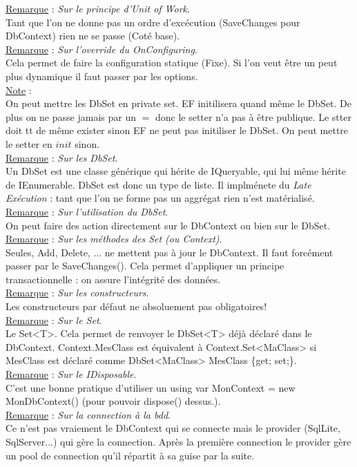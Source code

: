 \documentclass[a4paper,12pt,twoside]{article}
\newcommand{\rem}[2]{\noindent\underline{Remarque} : \textit{#1}.\\ \indent #2}
\newcommand{\note}[1]{\noindent\underline{Note} : \\ \indent #1}
\begin{document}
\rem{Sur le principe d'Unit of Work}{Tant que l'on ne donne pas un ordre d'excécution (SaveChanges pour DbContext) rien ne se passe (Coté base).}\\

\rem{Sur l'override du OnConfiguring}{Cela permet de faire la configuration statique (Fixe). Si l'on veut être un peut plus dynamique il faut passer par les options.}\\

\note{On peut mettre les DbSet en private set. EF initilisera quand même le DbSet. De plus on ne passe jamais par un $=$ donc le setter n'a pas à être publique. Le stter doit tt de même exister sinon EF ne peut pas initiliser le DbSet. On peut mettre le setter en $\textit{init}$ sinon.}\\

\rem{Sur les DbSet}{Un DbSet est une classe générique qui hérite de IQueryable, qui lui même hérite de IEnumerable. DbSet est donc un type de liste. Il implménete du \textit{Late Exécution} : tant que l'on ne forme pas un aggrégat rien n'est matérialisé. }\\

\rem{Sur l'utilisation du DbSet}{On peut faire des action directement sur le DbContext ou bien sur le DbSet.}\\

\rem{Sur les méthodes des Set (ou Context)}{Seules, Add, Delete, ... ne mettent pas à jour le DbContext. Il faut forcément passer par le SaveChanges(). Cela permet d'appliquer un principe transactionnelle : on assure l'intégrité des données.}\\

\rem{Sur les constructeurs}{Les constructeurs par défaut ne absoluement pas obligatoires!}\\

\rem{Sur le Set}{Le Set<T>. Cela permet de renvoyer le DbSet<T> déjà déclaré dans le DbContext. Context.MesClass est équivalent à Context.Set<MaClass> si MesClass est déclaré comme DbSet<MaClass> MesClass \{get; set;\}.}\\

\rem{Sur le IDisposable}{C'est une bonne pratique d'utiliser un using var MonContext = new MonDbContext() (pour pouvoir dispose() dessus.).}\\

\rem{Sur la connection à la bdd}{Ce n'est pas vraiement le DbContext qui se connecte mais le provider (SqlLite, SqlServer...) qui gère la connection. Après la première connection le provider gère un pool de connection qu'il répartit à sa guise par la suite.}\\
\end{document}
